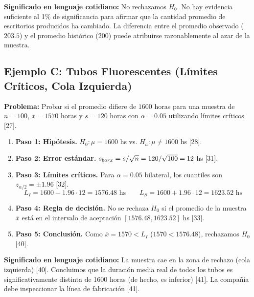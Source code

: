 \documentclass{article}
\begin{document}
\textbf{Significado en lenguaje cotidiano:} No rechazamos $H_0$. No hay evidencia suficiente al 1\% de significancia para afirmar que la cantidad promedio de escritorios producidos ha cambiado. La diferencia entre el promedio observado ($203.5$) y el promedio histórico ($200$) puede atribuirse razonablemente al azar de la muestra.

\subsection{Ejemplo C: Tubos Fluorescentes (Límites Críticos, Cola Izquierda)}
\textbf{Problema:} Probar si el promedio difiere de $1600$ horas para una muestra de $n = 100$, $\bar{x} = 1570$ horas y $s = 120$ horas con $\alpha = 0.05$ utilizando límites críticos [27].

\begin{enumerate}
    \item \textbf{Paso 1: Hipótesis.} $H_0: \mu = 1600$ hs vs. $H_a: \mu \neq 1600$ hs [28].
    \item \textbf{Paso 2: Error estándar.} $s_{\\bar{x}} = s/\sqrt{n} = 120/\sqrt{100} = 12$ hs [31].\\
    \item \textbf{Paso 3: Límites críticos.} Para $\alpha = 0.05$ bilateral, los cuantiles son $z_{\alpha/2} = \pm 1.96$ [32].
    \[ L_I = 1600 - 1.96 \cdot 12 = 1576.48 \text{ hs} \qquad L_S = 1600 + 1.96 \cdot 12 = 1623.52 \text{ hs} \]
    \item \textbf{Paso 4: Regla de decisión.} No se rechaza $H_0$ si el promedio de la muestra $\bar{x}$ está en el intervalo de aceptación $[1576.48, 1623.52]$ hs [33].
    \item \textbf{Paso 5: Conclusión.} Como $\bar{x} = 1570 < L_I$ ($1570 < 1576.48$), rechazamos $H_0$ [40].
\end{enumerate}

\textbf{Significado en lenguaje cotidiano:} La muestra cae en la zona de rechazo (cola izquierda) [40]. Concluimos que la duración media real de todos los tubos es significativamente distinta de 1600 horas (de hecho, es inferior) [41]. La compañía debe inspeccionar la línea de fabricación [41].
\end{document}
